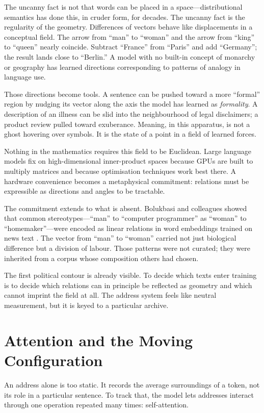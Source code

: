 \documentclass[12pt,a4paper]{article}
\begin{document}
The uncanny fact is not that words can be placed in a space---distributional semantics has done this, in cruder form, for decades. The uncanny fact is the regularity of the geometry. Differences of vectors behave like displacements in a conceptual field. The arrow from ``man'' to ``woman'' and the arrow from ``king'' to ``queen'' nearly coincide. Subtract ``France'' from ``Paris'' and add ``Germany''; the result lands close to ``Berlin.'' A model with no built-in concept of monarchy or geography has learned directions corresponding to patterns of analogy in language use.

Those directions become tools. A sentence can be pushed toward a more ``formal'' region by nudging its vector along the axis the model has learned as \emph{formality}. A description of an illness can be slid into the neighbourhood of legal disclaimers; a product review pulled toward exuberance. Meaning, in this apparatus, is not a ghost hovering over symbols. It is the state of a point in a field of learned forces.

Nothing in the mathematics requires this field to be Euclidean. Large language models fix on high-dimensional inner-product spaces because GPUs are built to multiply matrices and because optimisation techniques work best there. A hardware convenience becomes a metaphysical commitment: relations must be expressible as directions and angles to be tractable.

The commitment extends to what is absent. Bolukbasi and colleagues showed that common stereotypes---``man'' to ``computer programmer'' as ``woman'' to ``homemaker''---were encoded as linear relations in word embeddings trained on news text \cite{bolukbasi2016man}. The vector from ``man'' to ``woman'' carried not just biological difference but a division of labour. Those patterns were not curated; they were inherited from a corpus whose composition others had chosen.

The first political contour is already visible. To decide which texts enter training is to decide which relations can in principle be reflected as geometry and which cannot imprint the field at all. The address system feels like neutral measurement, but it is keyed to a particular archive.

\section{Attention and the Moving Configuration}

An address alone is too static. It records the average surroundings of a token, not its role in a particular sentence. To track that, the model lets addresses interact through one operation repeated many times: self-attention.
\end{document}
